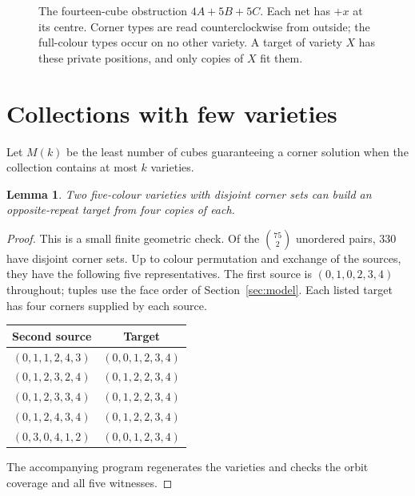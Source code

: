 \documentclass[11pt]{article}
\newtheorem{lemma}[theorem]{Lemma}
\theoremstyle{remark}
\begin{document}
\begin{figure}[ht]
\centering

\caption{The fourteen-cube obstruction $4A+5B+5C$. Each net has $+x$ at its
centre. Corner types are read counterclockwise from outside; the
full-colour types occur on no other variety. A target of variety $X$ has
these private positions, and only copies of $X$ fit them.}
\label{fig:obstruction}
\end{figure}






\section{Collections with few varieties}\label{sec:support}
Let $M(k)$ be the least number of cubes guaranteeing a corner solution when
the collection contains at most $k$ varieties.

\begin{lemma}\label{lem:disjoint-pair}
Two five-colour varieties with disjoint corner sets can build an
opposite-repeat target from four copies of each.
\end{lemma}
\begin{proof}
This is a small finite geometric check. Of the $\binom{75}{2}$ unordered
pairs, 330 have disjoint corner sets. Up to colour permutation and exchange
of the sources, they have the following five representatives. The first
source is $(0,1,0,2,3,4)$ throughout; tuples use the face order of
Section~\ref{sec:model}. Each listed target has four corners supplied by
each source.
\begin{center}
\begin{tabular}{cc}
\toprule
Second source & Target\\
\midrule
$(0,1,1,2,4,3)$ & $(0,0,1,2,3,4)$\\
$(0,1,2,3,2,4)$ & $(0,1,2,2,3,4)$\\
$(0,1,2,3,3,4)$ & $(0,1,2,2,3,4)$\\
$(0,1,2,4,3,4)$ & $(0,1,2,2,3,4)$\\
$(0,3,0,4,1,2)$ & $(0,0,1,2,3,4)$\\
\bottomrule
\end{tabular}
\end{center}
The accompanying program  regenerates
the varieties and checks the orbit coverage and all five witnesses.
\end{proof}
\end{document}
